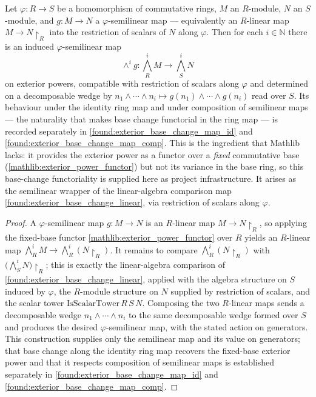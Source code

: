 \begin{lemma}
  \label{found:exterior_power_base_change}
  Let \(\varphi:R\to S\) be a homomorphism of commutative rings, \(M\) an
  \(R\)-module, \(N\) an \(S\)-module, and \(g:M\to N\) a \(\varphi\)-semilinear
  map --- equivalently an \(R\)-linear map \(M\to N{\restriction}_R\) into the
  restriction of scalars of \(N\) along \(\varphi\).  Then for each
  \(i\in\mathbb N\) there is an induced \(\varphi\)-semilinear map
  \[
    \wedge^i g:\textstyle\bigwedge^i_R M\to\bigwedge^i_S N
  \]
  on exterior powers, compatible with restriction of scalars along \(\varphi\) and
  determined on a decomposable wedge by \(n_1\wedge\cdots\wedge n_i\mapsto
  g(n_1)\wedge\cdots\wedge g(n_i)\) read over \(S\).  Its behaviour under the
  identity ring map and under composition of semilinear maps --- the naturality
  that makes base change functorial in the ring map --- is recorded separately in
  \cref{found:exterior_base_change_map_id} and
  \cref{found:exterior_base_change_map_comp}.
  This is the ingredient that Mathlib lacks: it provides the exterior power as a
  functor over a \emph{fixed} commutative base
  (\cref{mathlib:exterior_power_functor}) but not its variance in the base ring,
  so this base-change functoriality is supplied here as project infrastructure.
  It arises as the semilinear wrapper of the linear-algebra comparison map
  \cref{found:exterior_base_change_linear}, via restriction of scalars along \(\varphi\).
\end{lemma}

\begin{proof}
  \leanok
  A \(\varphi\)-semilinear map \(g:M\to N\) is an \(R\)-linear map
  \(M\to N{\restriction}_R\), so applying the fixed-base functor
  \cref{mathlib:exterior_power_functor} over \(R\) yields an \(R\)-linear map
  \(\bigwedge^i_R M\to\bigwedge^i_R(N{\restriction}_R)\).  It remains to compare
  \(\bigwedge^i_R(N{\restriction}_R)\) with \(\bigl(\bigwedge^i_S N\bigr){\restriction}_R\);
  this is exactly the linear-algebra comparison of
  \cref{found:exterior_base_change_linear}, applied with the algebra structure
  on \(S\) induced by \(\varphi\), the \(R\)-module structure on \(N\) supplied
  by restriction of scalars, and the scalar tower \(\mathrm{IsScalarTower}\,R\,S\,N\).
  Composing the two \(R\)-linear maps sends a decomposable wedge
  \(n_1\wedge\cdots\wedge n_i\) to the same decomposable wedge formed over \(S\)
  and produces the desired \(\varphi\)-semilinear map, with the stated action on
  generators.  This construction supplies only the semilinear map and its value on
  generators; that base change along the identity ring map recovers the fixed-base
  exterior power and that it respects composition of semilinear maps is established
  separately in \cref{found:exterior_base_change_map_id} and
  \cref{found:exterior_base_change_map_comp}.
\end{proof}


